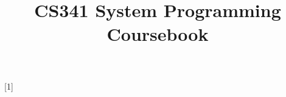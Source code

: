 \usepackage[Bjornstrup]{fncychap}
\singlespacing
\title{\vspace{-15mm}\fontsize{24pt}{10pt}\selectfont\textbf{CS341 System Programming Coursebook}}
\date{}

\newcommand{\keyword}[1]{\underline{\smash{\textbf{\texttt{#1}}}}}
\newcommand{\todo}[1]{}
\renewcommand{\todo}[1]{{\color{red} TODO: {#1}}}
\providecommand{\tightlist}{\setlength{\itemsep}{0pt}\setlength{\parskip}{0pt}}

\newenvironment{proof}{\begin{shaded*}\paragraph{Proof:}}{\hfill$\square$\end{shaded*}}
\newenvironment{tableau}{\begin{shaded*}\begin{longtable}}{\end{longtable}\end{shaded*}}
\usepackage{wrapfig}


\usepackage{csquotes}

[1]
  {\noindent\minipage{\linewidth}\medskip 
   \lstset{basicstyle=\ttfamily\footnotesize,frame=single,language=#1}}
  {\endminipage}

\usepackage{float}


\usepackage[compact]{titlesec}

\renewcommand{\baselinestretch}{1.15}
